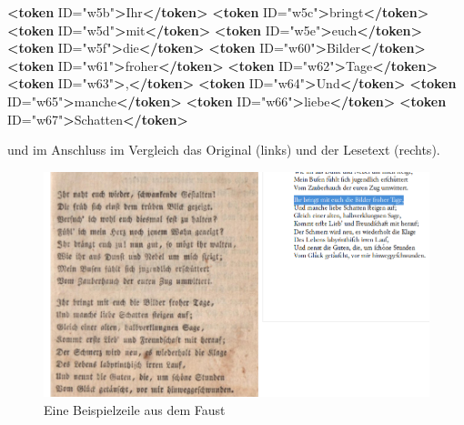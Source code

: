 \documentclass[ngerman,]{scrreprt}
\newenvironment{Shaded}{}{}
\newcommand{\KeywordTok}[1]{\textcolor[rgb]{0.00,0.44,0.13}{\textbf{#1}}}
\newcommand{\StringTok}[1]{\textcolor[rgb]{0.25,0.44,0.63}{#1}}
\newcommand{\OtherTok}[1]{\textcolor[rgb]{0.00,0.44,0.13}{#1}}
\newcommand{\NormalTok}[1]{#1}
\begin{document}
\begin{Shaded}
\begin{Highlighting}[]
\KeywordTok{<token}\OtherTok{ ID=}\StringTok{"w5b"}\KeywordTok{>}\NormalTok{Ihr}\KeywordTok{</token>}
\KeywordTok{<token}\OtherTok{ ID=}\StringTok{"w5c"}\KeywordTok{>}\NormalTok{bringt}\KeywordTok{</token>}
\KeywordTok{<token}\OtherTok{ ID=}\StringTok{"w5d"}\KeywordTok{>}\NormalTok{mit}\KeywordTok{</token>}
\KeywordTok{<token}\OtherTok{ ID=}\StringTok{"w5e"}\KeywordTok{>}\NormalTok{euch}\KeywordTok{</token>}
\KeywordTok{<token}\OtherTok{ ID=}\StringTok{"w5f"}\KeywordTok{>}\NormalTok{die}\KeywordTok{</token>}
\KeywordTok{<token}\OtherTok{ ID=}\StringTok{"w60"}\KeywordTok{>}\NormalTok{Bilder}\KeywordTok{</token>}
\KeywordTok{<token}\OtherTok{ ID=}\StringTok{"w61"}\KeywordTok{>}\NormalTok{froher}\KeywordTok{</token>}
\KeywordTok{<token}\OtherTok{ ID=}\StringTok{"w62"}\KeywordTok{>}\NormalTok{Tage}\KeywordTok{</token>}
\KeywordTok{<token}\OtherTok{ ID=}\StringTok{"w63"}\KeywordTok{>}\NormalTok{,}\KeywordTok{</token>}
\KeywordTok{<token}\OtherTok{ ID=}\StringTok{"w64"}\KeywordTok{>}\NormalTok{Und}\KeywordTok{</token>}
\KeywordTok{<token}\OtherTok{ ID=}\StringTok{"w65"}\KeywordTok{>}\NormalTok{manche}\KeywordTok{</token>}
\KeywordTok{<token}\OtherTok{ ID=}\StringTok{"w66"}\KeywordTok{>}\NormalTok{liebe}\KeywordTok{</token>}
\KeywordTok{<token}\OtherTok{ ID=}\StringTok{"w67"}\KeywordTok{>}\NormalTok{Schatten}\KeywordTok{</token>}
\end{Highlighting}
\end{Shaded}

und im Anschluss im Vergleich das Original (links) und der Lesetext (rechts).

\begin{figure}
\centering
\includegraphics{Bilder/Faust-S11-Faks.png}
\caption{Eine Beispielzeile aus dem Faust}
\end{figure}
\end{document}
